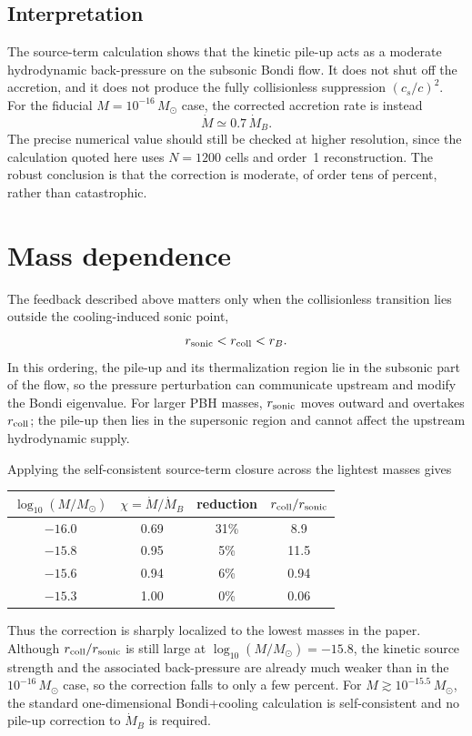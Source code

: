 \documentclass[12pt]{article}
\newcommand{\Msun}{M_\odot}
\newcommand{\Mdot}{\dot{M}}
\newcommand{\MdotB}{\dot{M}_B}
\newcommand{\rcoll}{r_{\rm coll}}
\newcommand{\rsonic}{r_{\rm sonic}}
\begin{document}
\subsection{Interpretation}

The source-term calculation shows that the kinetic pile-up acts as a
moderate hydrodynamic back-pressure on the subsonic Bondi flow. It does
not shut off the accretion, and it does not produce the fully
collisionless suppression $(c_s/c)^2$. For the fiducial
$M=10^{-16}\,\Msun$ case, the corrected accretion rate is instead
\begin{equation}
  \Mdot \simeq 0.7\,\MdotB .
\end{equation}
The precise numerical value should still be checked at higher
resolution, since the calculation quoted here uses $N=1200$ cells and
order~1 reconstruction. The robust conclusion is that the correction is
moderate, of order tens of percent, rather than catastrophic.

\section{Mass dependence}
\label{app:mass_dependence}

The feedback described above matters only when the collisionless
transition lies outside the cooling-induced sonic point,
\begin{equation}
  \rsonic < \rcoll < r_B .
\end{equation}
In this ordering, the pile-up and its thermalization region lie in the
subsonic part of the flow, so the pressure perturbation can communicate
upstream and modify the Bondi eigenvalue. For larger PBH masses,
$\rsonic$ moves outward and overtakes $\rcoll$; the pile-up then lies in
the supersonic region and cannot affect the upstream hydrodynamic
supply.

Applying the self-consistent source-term closure across the lightest
masses gives
\begin{center}
\begin{tabular}{cccc}
\toprule
$\log_{10}(M/\Msun)$ & $\chi=\Mdot/\MdotB$ & reduction & $\rcoll/\rsonic$ \\
\midrule
$-16.0$ & 0.69 & 31\% & 8.9 \\
$-15.8$ & 0.95 & 5\%  & 11.5 \\
$-15.6$ & 0.94 & 6\%  & 0.94 \\
$-15.3$ & 1.00 & 0\%  & 0.06 \\
\bottomrule
\end{tabular}
\end{center}
Thus the correction is sharply localized to the lowest masses in the
paper. Although $\rcoll/\rsonic$ is still large at
$\log_{10}(M/\Msun)=-15.8$, the kinetic source strength and the
associated back-pressure are already much weaker than in the
$10^{-16}\,\Msun$ case, so the correction falls to only a few percent.
For $M\gtrsim10^{-15.5}\,\Msun$, the standard one-dimensional
Bondi+cooling calculation is self-consistent and no pile-up correction
to $\MdotB$ is required.
\end{document}
